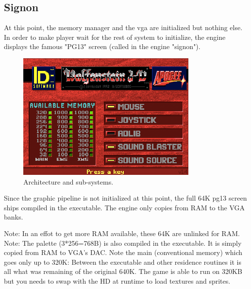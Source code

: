 \documentclass[book.tex]{subfiles}
\begin{document}
\subsection{Signon}
At this point, the memory manager and the vga are initialized but nothing else. In order to make player wait for the rest of system to initialize, the engine displays the famous "PG13" screen (called in the engine "signon").
\begin{figure}[H]
\centering
\includegraphics[width=\textwidth]{imgs/signon.png}
\caption{Architecture and sub-systems.}
\end{figure}
Since the graphic pipeline is not initialized at this point, the full 64K pg13 screen ships compiled in the executable. The engine only copies from RAM to the VGA banks.\\
\par 
\begin{minipage}{\textwidth}

\end{minipage}
Note: In an effot to get more RAM available, these 64K are unlinked for RAM.\\
Note: The palette (3*256=768B) is also compiled in the executable. It is simply copied from RAM to VGA's DAC.
Note the main (conventional memory) which goes only up to 320K: Between the executable and other residence routines it is all what was remaining of the original 640K. The game is able to run on 320KB but you needs to swap with the HD at runtime to load textures and sprites.
\end{document}
